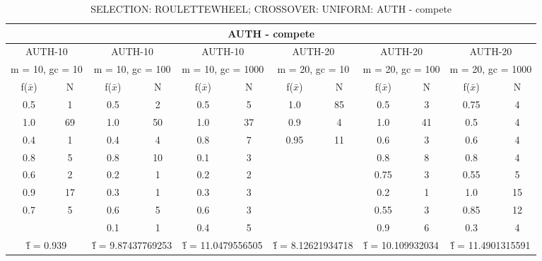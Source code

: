 \begin{table}[H]
	\centering
	\caption{SELECTION: ROULETTEWHEEL; CROSSOVER: UNIFORM: AUTH - compete}
	\begin{adjustbox}{width=1\textwidth}
		\begin{tabular}{ |c|c||c|c||c|c||c|c||c|c||c|c| }
			\hline
			\multicolumn{12}{|c|}{AUTH - compete} \\
			\hline
			\multicolumn{2}{|c||}{AUTH-10} & \multicolumn{2}{c||}{AUTH-10} & \multicolumn{2}{c||}{AUTH-10} & \multicolumn{2}{c||}{AUTH-20} & \multicolumn{2}{c||}{AUTH-20} & \multicolumn{2}{c|}{AUTH-20}\\
			\hline
			\multicolumn{2}{|c||}{m = 10, gc = 10} & \multicolumn{2}{c||}{m = 10, gc = 100} & \multicolumn{2}{c||}{m = 10, gc = 1000} & \multicolumn{2}{c||}{m = 20, gc = 10} & \multicolumn{2}{c||}{m = 20, gc = 100} & \multicolumn{2}{c|}{m = 20, gc = 1000}\\
			\hline
			f($\bar{x}$) & N & f($\bar{x}$) & N & f($\bar{x}$) & N & f($\bar{x}$) & N & f($\bar{x}$) & N & f($\bar{x}$) & N\\
			\hline
			\hline
			0.5 & 1 & 0.5 & 2 & 0.5 & 5 & 1.0 & 85 & 0.5 & 3 & 0.75 & 4\\
			1.0 & 69 & 1.0 & 50 & 1.0 & 37 & 0.9 & 4 & 1.0 & 41 & 0.5 & 4\\
			0.4 & 1 & 0.4 & 4 & 0.8 & 7 & 0.95 & 11 & 0.6 & 3 & 0.6 & 4\\
			0.8 & 5 & 0.8 & 10 & 0.1 & 3 &   &   & 0.8 & 8 & 0.8 & 4\\
			0.6 & 2 & 0.2 & 1 & 0.2 & 2 &   &   & 0.75 & 3 & 0.55 & 5\\
			0.9 & 17 & 0.3 & 1 & 0.3 & 3 &   &   & 0.2 & 1 & 1.0 & 15\\
			0.7 & 5 & 0.6 & 5 & 0.6 & 3 &   &   & 0.55 & 3 & 0.85 & 12\\
			&   & 0.1 & 1 & 0.4 & 5 &   &   & 0.9 & 6 & 0.3 & 4\\
			\hline
			\multicolumn{2}{|c||}{\^{f} = 0.939} & \multicolumn{2}{c||}{\^{f} = 9.87437769253} & \multicolumn{2}{c||}{\^{f} = 11.0479556505} & \multicolumn{2}{c||}{\^{f} = 8.12621934718} & \multicolumn{2}{c||}{\^{f} = 10.109932034} & \multicolumn{2}{c|}{\^{f} = 11.4901315591}\\
			\hline
		\end{tabular}
	\end{adjustbox}
\end{table}
